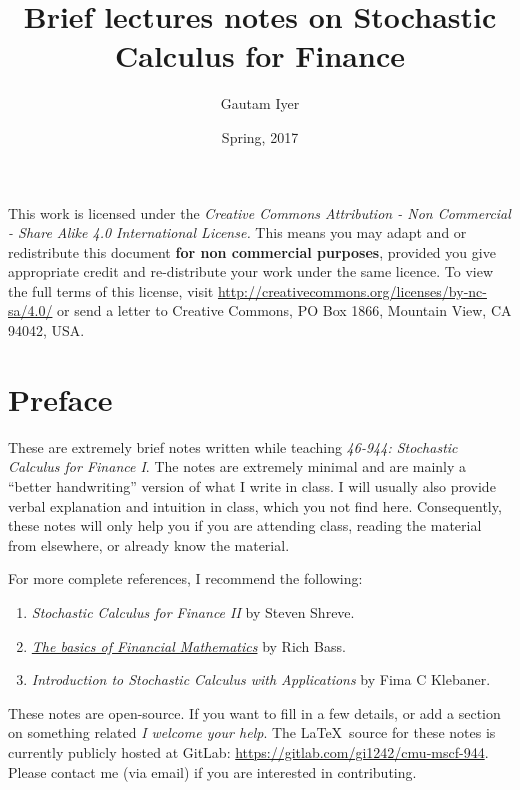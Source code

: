 
\frontmatter
\title{Brief lectures notes on Stochastic Calculus for Finance}
\author{Gautam Iyer}
\date{Spring, 2017}
\hypersetup{pageanchor=false}
\maketitle%

This work is licensed under the \emph{Creative Commons Attribution - Non Commercial - Share Alike 4.0 International License.}
This means you may adapt and or redistribute this document \textbf{for non commercial purposes}, provided you give appropriate credit and re-distribute your work under the same licence.
To view the full terms of this license, visit \url{http://creativecommons.org/licenses/by-nc-sa/4.0/} or send a letter to Creative Commons, PO Box 1866, Mountain View, CA 94042, USA.
\maketitle

\chapter*{Preface}

These are extremely brief notes written while teaching \emph{46-944: Stochastic Calculus for Finance I}.
The notes are extremely minimal and are mainly a ``better handwriting'' version of what I write in class.
I will usually also provide verbal explanation and intuition in class, which you  not find here.
Consequently, these notes will only help you if you are attending class, reading the material from elsewhere, or already know the material.

For more complete references, I recommend the following:
\begin{enumerate}
  \item
    \emph{Stochastic Calculus for Finance II} by Steven Shreve.
  \item 
    \emph{\href{http://bass.math.uconn.edu/finlmath.pdf}{The basics of Financial Mathematics}} by Rich Bass.
  \item
    \emph{Introduction to Stochastic Calculus with Applications} by Fima C Klebaner.
\end{enumerate}

\bigskip

\begin{note}[Contributing]
  These notes are open-source.
  If you want to fill in a few details, or add a section on something related \emph{I welcome your help}.
  The \LaTeX\ source for these notes is currently publicly hosted at GitLab: \url{https://gitlab.com/gi1242/cmu-mscf-944}.
  Please contact me (via email) if you are interested in contributing.
\end{note}

\tableofcontents\thispagestyle{empty}
\mainmatter
\hypersetup{pageanchor=true}

